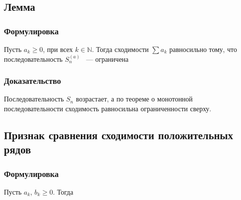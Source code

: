 \documentclass{article}
\begin{document}
        \subsection{Лемма}
        
            \subsubsection{Формулировка}
            
                Пусть $a_k \geq 0$, при всех $k \in \mathbb{N}$. Тогда сходимости $\sum a_k$ равносильно тому, что последовательность $S_n^{(a)}$ ~--- ограничена
                
            \subsubsection{Доказательство}
            
                Последовательность ${S_n}$ возрастает, а по теореме о монотонной последовательности сходимость равносильна ограниченности сверху.
                
        \subsection{Признак сравнения сходимости положительных рядов}
        
            \subsubsection{Формулировка}
            
                Пусть $a_k$, $b_k \geq 0$. Тогда
                
\end{document}
